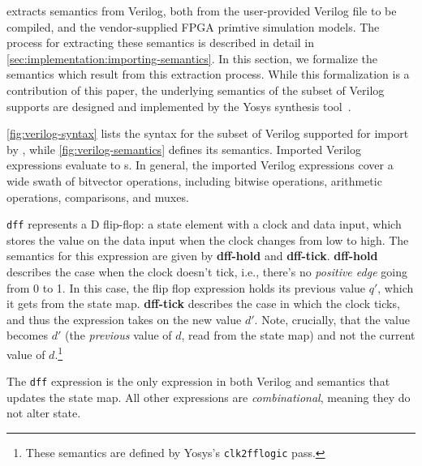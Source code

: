 



\lr extracts semantics from Verilog,
  both from the user-provided Verilog file
  to be compiled,
  and the vendor-supplied FPGA primtive
  simulation models.
The process for extracting these semantics
  is described in detail in
  \cref{sec:implementation:importing-semantics}.
In this section, we formalize 
  the semantics
  which result from this extraction process.
While this formalization
  is a contribution of this paper,
  the underlying semantics
  of the subset of Verilog
  \lr supports
  are designed and implemented by
  the Yosys synthesis tool~\cite{wolf2013yosys}.

\cref{fig:verilog-syntax}
  lists the syntax for the subset of Verilog 
  supported for import by \lr,
  while \cref{fig:verilog-semantics}
  defines its semantics.
Imported Verilog expressions evaluate to \signal{}s.
In general, the imported Verilog expressions
  cover a wide swath
  of bitvector operations,
  including bitwise operations,
  arithmetic operations,
  comparisons,
  and muxes.

\texttt{dff} represents
  a D flip-flop: a state element
  with a clock and data input,
  which stores the value on the data input
  when the clock changes from low to high.
The semantics for this expression
  are given by \textbf{dff-hold}
  and \textbf{dff-tick}.
\textbf{dff-hold}
  describes 
  the case when the clock doesn't tick,
  i.e., there's no \textit{positive edge}
  going from 0 to 1.
In this case,
  the flip flop expression holds
  its previous value $q'$,
  which it gets from the state map.
\textbf{dff-tick}
  describes the case in which
  the clock ticks,
  and thus the expression
  takes on the new value $d'$.
Note, crucially,
  that the value becomes $d'$
  (the \textit{previous} value of $d$,
  read from the state map)
  and not the current value of $d$.\footnote{
  These semantics are defined by
  Yosys's \texttt{clk2fflogic} pass.
}


The \texttt{dff} expression is the 
  only expression
  in both Verilog and \lrir semantics
  that updates the state map.
All other expressions
  are \textit{combinational},
  meaning they do
  not alter state.
  


